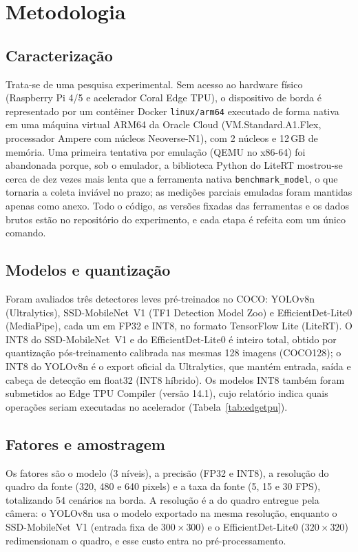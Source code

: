 \section{Metodologia}
\label{sec:metodologia}

\subsection{Caracterização}
Trata-se de uma pesquisa experimental. Sem acesso ao hardware físico (Raspberry Pi 4/5 e acelerador
Coral Edge TPU), o dispositivo de borda é representado por um contêiner Docker \texttt{linux/arm64}
executado de forma nativa em uma máquina virtual ARM64 da Oracle Cloud (VM.Standard.A1.Flex, processador
Ampere com núcleos Neoverse-N1), com 2 núcleos e 12\,GB de memória. Uma primeira tentativa por emulação
(QEMU no x86-64) foi abandonada porque, sob o emulador, a biblioteca Python do LiteRT mostrou-se cerca de
dez vezes mais lenta que a ferramenta nativa \texttt{benchmark\_model}, o que tornaria a coleta inviável
no prazo; as medições parciais emuladas foram mantidas apenas como anexo. Todo o código, as versões
fixadas das ferramentas e os dados brutos estão no repositório do experimento, e cada etapa é refeita
com um único comando.

\subsection{Modelos e quantização}
Foram avaliados três detectores leves pré-treinados no COCO: YOLOv8n (Ultralytics), SSD-MobileNet~V1
(TF1 Detection Model Zoo) e EfficientDet-Lite0 (MediaPipe), cada um em FP32 e INT8, no formato
TensorFlow Lite (LiteRT). O INT8 do SSD-MobileNet~V1 e do EfficientDet-Lite0 é inteiro total, obtido por
quantização pós-treinamento calibrada nas mesmas 128 imagens (COCO128); o INT8 do YOLOv8n é o
export oficial da Ultralytics, que mantém entrada, saída e cabeça de detecção em float32 (INT8
híbrido). Os modelos INT8 também foram submetidos ao Edge TPU Compiler (versão 14.1), cujo relatório
indica quais operações seriam executadas no acelerador (Tabela~\ref{tab:edgetpu}).

\subsection{Fatores e amostragem}
Os fatores são o modelo (3 níveis), a precisão (FP32 e INT8), a resolução do quadro da fonte (320, 480
e 640 pixels) e a taxa da fonte (5, 15 e 30 FPS), totalizando 54 cenários na borda. A resolução é a do
quadro entregue pela câmera: o YOLOv8n usa o modelo exportado na mesma resolução, enquanto o
SSD-MobileNet~V1 (entrada fixa de $300\times300$) e o EfficientDet-Lite0 ($320\times320$) redimensionam o
quadro, e esse custo entra no pré-processamento.

